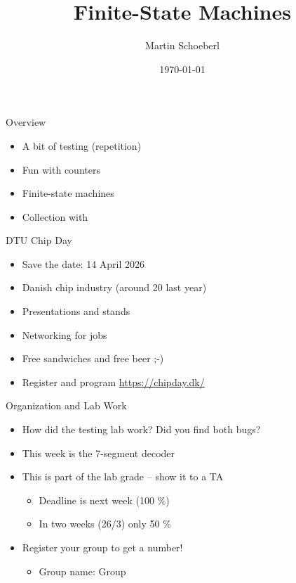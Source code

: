 

\newif\ifbook


\title{Finite-State Machines}
\author{Martin Schoeberl}
\date{\today}



\begin{frame}
\titlepage
\end{frame}

\begin{frame}[fragile]{Overview}
\begin{itemize}
\item A bit of testing (repetition)
\item Fun with counters
\item Finite-state machines
\item Collection with 
\end{itemize}
\end{frame}

\begin{frame}[fragile]{DTU Chip Day}
\begin{itemize}
\item Save the date: 14 April 2026
\item Danish chip industry (around 20 last year)
\item Presentations and stands
\item Networking for jobs
\item Free sandwiches and free beer ;-)
\item Register and program \url{https://chipday.dk/}
\end{itemize}
\end{frame}

\begin{frame}[fragile]{Organization and Lab Work}
\begin{itemize}
\item How did the testing lab work? Did you find both bugs?
\item This week is the 7-segment decoder
\item This is part of the lab grade -- show it to a TA
\begin{itemize}
\item Deadline is next week (100 \%)
\item In two weeks (26/3) only 50 \%
\end{itemize}
\item Register your group to get a number!
\begin{itemize}
\item Group name: Group
\end{itemize}
\end{itemize}
\end{frame}



